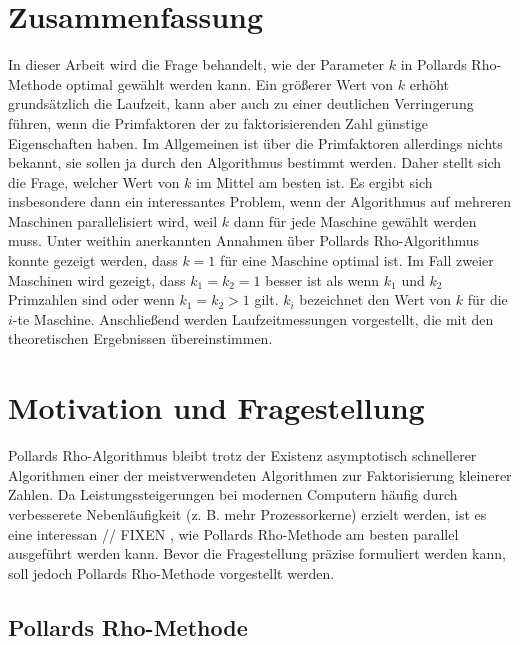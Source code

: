 \documentclass[a4paper, 11pt, ngerman]{article}
\begin{document}
\newpage

\section{Zusammenfassung}

In dieser Arbeit wird die Frage behandelt, wie der Parameter $k$ in Pollards Rho-Methode optimal gewählt werden kann. Ein größerer Wert von $k$ erhöht grundsätzlich die Laufzeit, kann aber auch zu einer deutlichen Verringerung führen, wenn die Primfaktoren der zu faktorisierenden Zahl günstige Eigenschaften haben. Im Allgemeinen ist über die Primfaktoren allerdings nichts bekannt, sie sollen ja durch den Algorithmus bestimmt werden. Daher stellt sich die Frage, welcher Wert von $k$ im Mittel am besten ist. Es ergibt sich insbesondere dann ein interessantes Problem, wenn der Algorithmus auf mehreren Maschinen parallelisiert wird, weil $k$ dann für jede Maschine gewählt werden muss. Unter weithin anerkannten Annahmen über Pollards Rho-Algorithmus konnte gezeigt werden, dass $k = 1$ für eine Maschine optimal ist. Im Fall zweier Maschinen wird gezeigt, dass $k_1 = k_2 = 1$ besser ist als wenn $k_1$ und $k_2$ Primzahlen sind oder wenn $k_1 = k_2 > 1$ gilt. $k_i$ bezeichnet den Wert von $k$ für die $i$-te Maschine. Anschließend werden Laufzeitmessungen vorgestellt, die mit den theoretischen Ergebnissen übereinstimmen.

\section{Motivation und Fragestellung}

Pollards Rho-Algorithmus bleibt trotz der Existenz asymptotisch schnellerer Algorithmen einer der meistverwendeten Algorithmen zur Faktorisierung kleinerer Zahlen. Da Leistungssteigerungen bei modernen Computern häufig durch verbesserete Nebenläufigkeit (z. B. mehr Prozessorkerne) erzielt werden, ist es eine interessan // FIXEN , wie Pollards Rho-Methode am besten parallel ausgeführt werden kann. Bevor die Fragestellung präzise formuliert werden kann, soll jedoch Pollards Rho-Methode vorgestellt werden.

\subsection{Pollards Rho-Methode}
\end{document}
